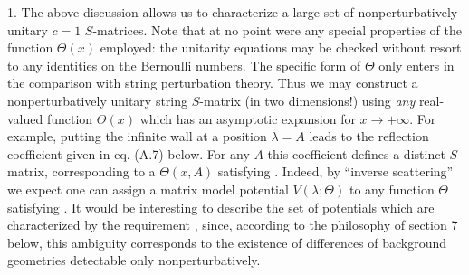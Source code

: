 \medskip
 
 
1. The above discussion allows us to
characterize a large set of nonperturbatively unitary $c=1$
$S$-matrices. Note that at no point were any special properties of the
function $\Theta(x)$ employed: the unitarity equations may be
checked without resort to any identities on the Bernoulli
numbers. The specific form of $\Theta$ only enters in
the comparison with string perturbation theory. Thus we
may construct a nonperturbatively unitary string $S$-matrix 
(in two dimensions!) using {\it any}      
real-valued function $\Theta(x)$ which has an asymptotic expansion
\eqn{}
for $x\to +\infty$. 
For example, putting the infinite wall at a position $\lambda=A$
leads to the reflection coefficient given in eq. (A.7) below.
For any $A$ this coefficient defines a distinct $S$-matrix,
corresponding to a $\Theta(x,A)$ satisfying \asymreq.
Indeed, by ``inverse scattering'' we expect one can
assign a matrix model potential $V(\lambda;\Theta)$ to any 
function $\Theta$ satisfying \asymreq. It would be interesting
to describe the set of potentials which are characterized by 
the requirement \asymreq, since, according to the philosophy 
of section 7 below, this ambiguity corresponds to the existence of
differences of background geometries detectable only nonperturbatively.
 
